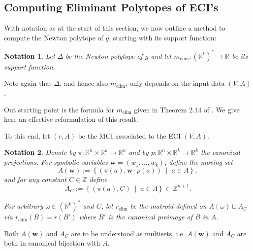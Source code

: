 \documentclass[a4paper]{article}
\newtheorem{notation}{Notation}
\theoremstyle{remark}
\newcommand{\setdes}[2]{\left\{#1\;\middle|\;#2\right\}}
\def\RR{\mathbb{R}}
\def\ZZ{\mathbb{Z}}
\def\ww{\mathbf{w}}
\def\melim{m_{\text{elim}}}
\begin{document}
\subsection{Computing Eliminant Polytopes of ECI's}
\label{sec:elimpol}

With notation as at the start of this section, we now outline a method
to compute the Newton polytope of $g$, starting with its support function: 
\begin{notation}
  Let $\Delta$ be the Newton polytope of $g$ and let $\melim : (\RR^k)^{*} \rightarrow \RR$ be its
  support function.
\end{notation}
Note again that $\Delta$, and hence also $\melim$, only depends on the
input data $(V, A)$.

Out starting point is the formula for $\melim$ given in Theorem 2.14
of \cite{esterovEngineeredCompleteIntersections2025}. We give
here an effective reformulation of this result.

To this end, let $(r,A)$ be the MCI associated to the ECI
$(V,A)$.
\begin{notation}
  Denote by $\pi:\RR^n\times \RR^k\rightarrow \RR^n$ and by
  $p : \RR^n\times \RR^k \rightarrow \RR^k$ the canonical projections.
  For symbolic variables $\ww = (w_1,\dots,w_k)$, define the moving set
  \[A(\ww) := \setdes{(\pi(a),\ww \cdot p(a))}{a\in A},\] and for any
  constant $C\in \ZZ$ define
  \[A_{C} := \setdes{(\pi(a),C)}{a\in A} \subset \ZZ^{n+1}.\]

  For arbitrary $\omega \in (\RR^k)^{*}$ and $C$, let
  $r_{\text{elim}}$ be the matroid defined on $A(\omega) \sqcup A_C$ via
  $r_{\text{elim}}(B) = r(B')$ where $B'$ is the canonical preimage of
  $B$ in $A$.
\end{notation}

Both $A(\ww)$ and $A_C$ are to be understood as multisets, i.e.
$A(\ww)$ and $A_C$ are both in canonical bijection with $A$.
\end{document}
